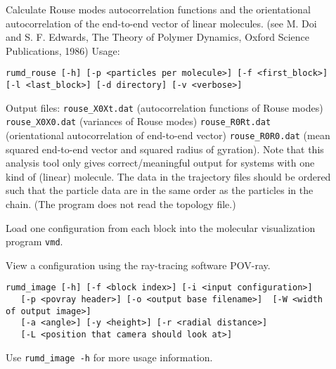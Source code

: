 \documentclass[a4paper]{article}
\begin{document}
\begin{description}
\item[] Calculate Rouse modes autocorrelation functions and the orientational autocorrelation of the end-to-end vector of linear molecules. (see M. Doi and S. F. Edwards, The Theory of Polymer Dynamics, Oxford Science Publications, 1986)
Usage:
\begin{verbatim}
rumd_rouse [-h] [-p <particles per molecule>] [-f <first_block>] 
[-l <last_block>] [-d directory] [-v <verbose>]
\end{verbatim}
Output files:
\verb|rouse_X0Xt.dat| (autocorrelation functions of Rouse modes)
\verb|rouse_X0X0.dat| (variances of Rouse modes)
\verb|rouse_R0Rt.dat| (orientational autocorrelation of end-to-end vector)
\verb|rouse_R0R0.dat| (mean squared end-to-end vector and squared radius of gyration).
Note that this analysis tool only gives correct/meaningful output for systems with one kind of (linear) molecule. The data in the trajectory files should be ordered such that the particle data are in the same order as the particles in the chain. (The program does not read the topology file.)
\item[] Load one configuration from each block into the
molecular visualization program \verb|vmd|.
\item[] View a configuration using the ray-tracing software POV-ray.
\begin{verbatim}
rumd_image [-h] [-f <block index>] [-i <input configuration>]
   [-p <povray header>] [-o <output base filename>]  [-W <width of output image>]
   [-a <angle>] [-y <height>] [-r <radial distance>]
   [-L <position that camera should look at>]
\end{verbatim} 
Use \verb|rumd_image -h| for more usage information.
\end{description}
\end{document}
